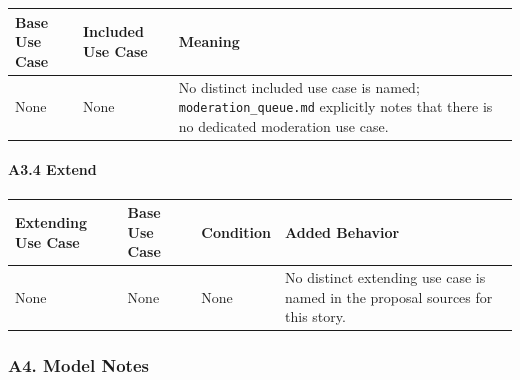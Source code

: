 \documentclass[12pt]{article}
\renewcommand{\baselinestretch}{1.5}
\begin{document}
\begingroup
\small
\renewcommand{\baselinestretch}{1.0}\selectfont
\renewcommand{\arraystretch}{1.15}
\setlength{\tabcolsep}{6pt}
\begin{longtable}{|>{\raggedright\arraybackslash}p{}|>{\raggedright\arraybackslash}p{}|>{\raggedright\arraybackslash}p{}|}
\hline
\textbf{Base Use Case} & \textbf{Included Use Case} & \textbf{Meaning} \\ \hline
\endhead
None & None & No distinct included use case is named; \texttt{moderation\_queue.md} explicitly notes that there is no dedicated moderation use case. \\ \hline
\end{longtable}
\endgroup
\par\medskip

\hypertarget{sec:a3-4-extend}{}
\paragraph*{A3.4 Extend}
\par\medskip

\begingroup
\small
\renewcommand{\baselinestretch}{1.0}\selectfont
\renewcommand{\arraystretch}{1.15}
\setlength{\tabcolsep}{6pt}
\begin{longtable}{|>{\raggedright\arraybackslash}p{}|>{\raggedright\arraybackslash}p{}|>{\raggedright\arraybackslash}p{}|>{\raggedright\arraybackslash}p{}|}
\hline
\textbf{Extending Use Case} & \textbf{Base Use Case} & \textbf{Condition} & \textbf{Added Behavior} \\ \hline
\endhead
None & None & None & No distinct extending use case is named in the proposal sources for this story. \\ \hline
\end{longtable}
\endgroup
\par\medskip

\hypertarget{sec:a4-model-notes}{}
\subsubsection*{A4. Model Notes}
\par\medskip
\end{document}
